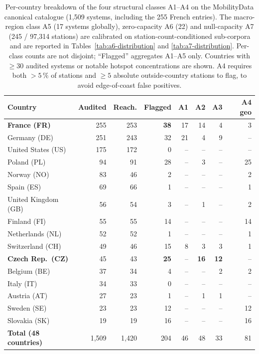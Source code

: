 \documentclass[11pt,a4paper]{article}
\begin{document}
\begin{table}[!htbp]
\centering
\caption{Per-country breakdown of the four structural classes
A1--A4 on the MobilityData canonical catalogue (1{,}509 systems,
including the 255 French entries). The macro-region class A5
(17 systems globally), zero-capacity A6 (22) and null-capacity A7
(245 / 97{,}314 stations) are calibrated on station-count-conditioned
sub-corpora and are reported in
Tables~\ref{tab:a6-distribution} and \ref{tab:a7-distribution}.
Per-class counts are not disjoint; ``Flagged'' aggregates A1--A5
only. Countries with $\geq 30$ audited systems or notable hotspot
concentrations are shown. A4 requires both $>5\,\%$ of stations
and $\geq 5$ absolute outside-country stations to flag, to avoid
edge-of-coast false positives.}
\label{tab:global-audit}
\small
\begin{tabular}{@{}lrrrrrrr@{}}
\toprule
\textbf{Country} & \textbf{Audited} & \textbf{Reach.} & \textbf{Flagged}
   & \textbf{A1} & \textbf{A2} & \textbf{A3} & \textbf{A4 geo}\\
\midrule
\textbf{France (FR)}      & 255 & 253 & \textbf{38} & 17 & 14 &  4 &  3 \\
Germany (DE)              & 251 & 243 & 32 & 21 &  4 &  9 & -- \\
United States (US)        & 175 & 172 &  0 & -- & -- & -- & -- \\
Poland (PL)               &  94 &  91 & 28 & -- &  3 & -- & 25 \\
Norway (NO)               &  83 &  46 &  2 & -- & -- & -- &  2 \\
Spain (ES)                &  69 &  66 &  1 & -- & -- & -- &  1 \\
United Kingdom (GB)       &  56 &  54 &  3 & -- &  1 & -- &  2 \\
Finland (FI)              &  55 &  55 & 14 & -- & -- & -- & 14 \\
Netherlands (NL)          &  52 &  52 &  1 & -- & -- & -- &  1 \\
Switzerland (CH)          &  49 &  46 & 15 &  8 &  3 &  3 &  1 \\
\textbf{Czech Rep.\ (CZ)} &  45 &  43 & \textbf{25} & -- & \textbf{16} & \textbf{12} & -- \\
Belgium (BE)              &  37 &  34 &  4 & -- & -- &  2 &  2 \\
Italy (IT)                &  34 &  33 &  0 & -- & -- & -- & -- \\
Austria (AT)              &  27 &  23 &  1 & -- &  1 &  1 & -- \\
Sweden (SE)               &  23 &  23 & 12 & -- & -- & -- & 12 \\
Slovakia (SK)             &  19 &  19 & 16 & -- & -- & -- & 16 \\
\midrule
\textbf{Total (48 countries)} & 1{,}509 & 1{,}420 & 204 & 46 & 48 & 33 & 81 \\
\bottomrule
\end{tabular}


\end{table}
\end{document}
